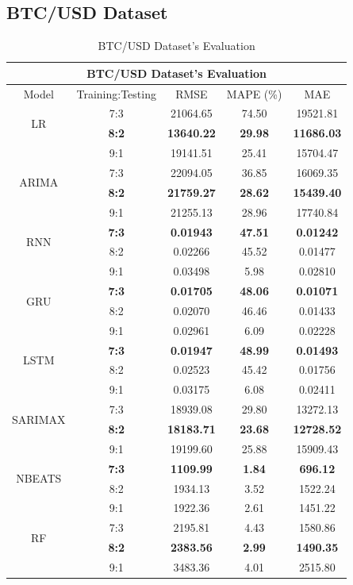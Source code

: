 \documentclass{ieeeojies}
\begin{document}
\subsection{BTC/USD Dataset}
\begin{table}[H]
	\centering
	\begin{tabular}{|c|c|c|c|c|}
		\hline
		\multicolumn{5}{|c|}{\textbf{BTC/USD Dataset's Evaluation}}\\
		\hline
		\centering Model & Training:Testing & RMSE & MAPE (\%) & MAE\\
		\hline
		\multirow{2}{*}{LR} & 7:3 & 21064.65 &  74.50 &  19521.81 \\ & \textbf{8:2} & \textbf{13640.22} &  \textbf{29.98} &  \textbf{11686.03} \\ & 9:1 & 19141.51 & 25.41 & 15704.47\\
		\hline
		\multirow{2}{*}{ARIMA} & 7:3 & 22094.05 & 36.85 & 16069.35 \\ & \textbf{8:2} & \textbf{21759.27}& \textbf{28.62} & \textbf{15439.40} \\ & 9:1 & 21255.13 & 28.96 & 17740.84\\
		\hline
		\multirow{2}{*}{RNN} & \textbf{7:3}& \textbf{0.01943} & \textbf{47.51} & \textbf{0.01242}\\ & 8:2& 0.02266 & 45.52 & 0.01477 \\ & 9:1 & 0.03498 & 5.98 & 0.02810\\
		\hline
		\multirow{2}{*}{GRU} & \textbf{7:3}	&  \textbf{0.01705} & \textbf{48.06} & \textbf{0.01071} \\ & 8:2 & 0.02070 & 46.46 &  0.01433 \\ & 9:1 & 0.02961  & 6.09 & 0.02228\\
		\hline
		\multirow{2}{*}{LSTM} & \textbf{7:3} &  \textbf{0.01947} &  \textbf{48.99} & \textbf{0.01493} \\ & 8:2 &  0.02523 & 45.42 &  0.01756 \\ & 9:1 & 0.03175  & 6.08 & 0.02411\\
		\hline
		\multirow{2}{*}{SARIMAX} & 7:3	& 18939.08 & 29.80 & 13272.13 \\ & \textbf{8:2} & \textbf{18183.71} & \textbf{23.68} & \textbf{12728.52} \\ & 9:1 & 19199.60 & 25.88 & 15909.43\\
		\hline
		\multirow{2}{*}{NBEATS} & \textbf{7:3} & \textbf{1109.99} & \textbf{1.84} & \textbf{696.12} \\ & 8:2 & 1934.13 & 3.52 & 1522.24 \\ & 9:1 & 1922.36	& 2.61 & 1451.22 \\
		\hline
		\multirow{2}{*}{RF} & 7:3 & 2195.81 & 4.43 & 1580.86 \\ & \textbf{8:2} & \textbf{2383.56} & \textbf{2.99} & \textbf{1490.35} \\ & 9:1 & 3483.36 & 4.01 & 2515.80 \\
		\hline
	\end{tabular}
	\caption{BTC/USD Dataset's Evaluation}
	\label{btcresult}
\end{table}
\end{document}
